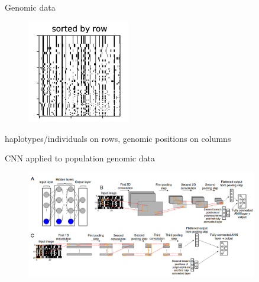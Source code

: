 \begin{frame}{Genomic data}

	\begin{figure}
    		\includegraphics[width=0.4\textwidth]{Pics/example.png}
	\end{figure}

	haplotypes/individuals on rows, genomic positions on columns

\end{frame}

\begin{frame}{CNN applied to population genomic data}

    \begin{figure}
        \includegraphics[width=0.9\textwidth]{Pics/flagel.png}
        \end{figure}

\end{frame}

















